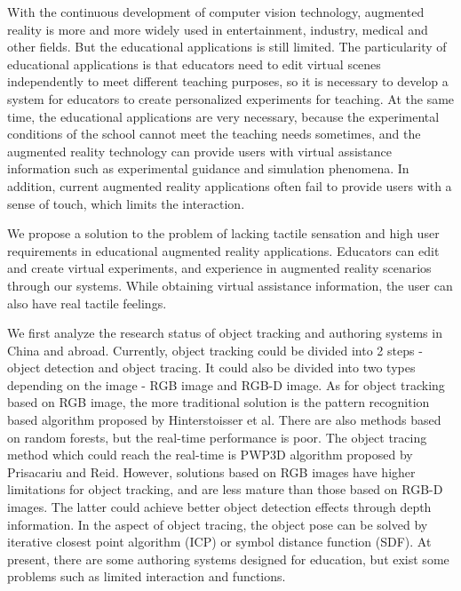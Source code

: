 \begin{bigabstract}
With the continuous development of computer vision technology, augmented reality is more and more widely used in entertainment, industry, medical and other fields. But the educational applications is still limited. The particularity of educational applications is that educators need to edit virtual scenes independently to meet different teaching purposes, so it is necessary to develop a system for educators to create personalized experiments for teaching. At the same time, the educational applications are very necessary, because the experimental conditions of the school cannot meet the teaching needs sometimes, and the augmented reality technology can provide users with virtual assistance information such as experimental guidance and simulation phenomena. In addition, current augmented reality applications often fail to provide users with a sense of touch, which limits the interaction.

We propose a solution to the problem of lacking tactile sensation and high user requirements in educational augmented reality applications. Educators can edit and create virtual experiments, and experience in augmented reality scenarios through our systems. While obtaining virtual assistance information, the user can also have real tactile feelings.

We first analyze the research status of object tracking and authoring systems in China and abroad. Currently, object tracking could be divided into 2 steps - object detection and object tracing. It could also be divided into two types depending on the image - RGB image and RGB-D image. As for object tracking based on RGB image, the more traditional solution is the pattern recognition based algorithm proposed by Hinterstoisser et al\cite{hinterstoisser2011gradient}. There are also methods based on random forests\cite{brachmann2016uncertainty}, but the real-time performance is poor. The object tracing method which could reach the real-time is PWP3D algorithm proposed by Prisacariu and Reid\cite{prisacariu2012pwp3d}. However, solutions based on RGB images have higher limitations for object tracking, and are less mature than those based on RGB-D images. The latter could achieve better object detection effects through depth information. In the aspect of object tracing, the object pose can be solved by iterative closest point algorithm (ICP) or symbol distance function (SDF). At present, there are some authoring systems designed for education, but exist some problems such as limited interaction and functions.


\end{bigabstract}
